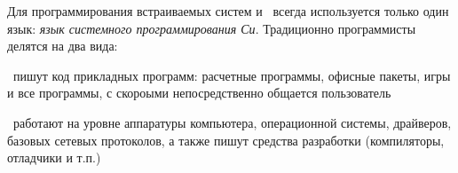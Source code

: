 \clearpage
Для программирования встраиваемых систем и \ всегда
используется только один язык: \emph{язык системного программирования
Си}.
Традиционно программисты делятся на два вида:
\begin{description}[nosep]
\item[прикладные программисты (верхнего уровня)]\ пишут код прикладных программ:
расчетные программы, офисные пакеты, игры и все программы, с
скороыми непосредственно общается пользователь
\item[системные программисты (нижнего уровня)]\ работают на уровне аппаратуры
компьютера, операционной системы, драйверов, базовых сетевых протоколов, а также
пишут средства разработки (компиляторы, отладчики и т.п.)
\end{description}

\secup
